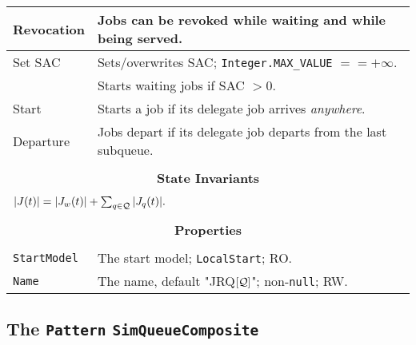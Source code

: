\begin{tabular}{|l|l|}
	\hline
	Revocation & Jobs can be revoked while waiting and while being served. \\
	\hline
	Set SAC & Sets/overwrites SAC; \lstinline|Integer.MAX_VALUE| $== +\infty$. \\
	& Starts waiting jobs if SAC $> 0$. \\
	\hline
	Start & Starts a job if its delegate job arrives {\em anywhere}. \\
	\hline
	Departure & Jobs depart if its delegate job departs from the last subqueue. \\
	\hline
	\multicolumn{2}{|c|}{} \\
	\multicolumn{2}{|c|}{\bf State  Invariants} \\
	\multicolumn{2}{|c|}{} \\
	\hline
	\multicolumn{2}{|l|}{$|J(t)| = |J_{w}(t)| + \sum_{q \in \cal{Q}} |J_{q}(t)|.$} \\
	\hline
	\multicolumn{2}{|c|}{} \\
	\multicolumn{2}{|c|}{\bf Properties} \\
	\multicolumn{2}{|c|}{} \\
	\hline
	\lstinline|StartModel| & The start model; \lstinline|LocalStart|; RO. \\
	\hline
	\lstinline|Name|       & The name, default "JRQ$[\cal{Q}]$"; non-\lstinline|null|; RW. \\
	\hline
\end{tabular}

\subsection{The \lstinline{Pattern} \lstinline{SimQueueComposite}}
\label{sec:Pattern}

